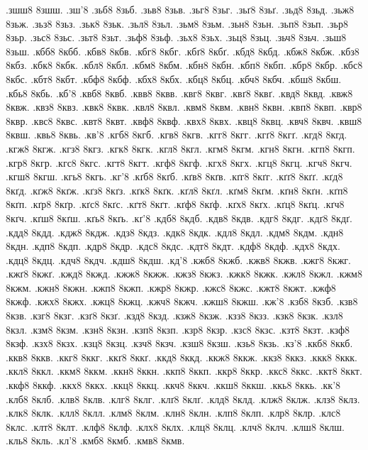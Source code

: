 {.зшш8 8зшш.
.зш'8
.зьб8 8зьб.
.зьв8 8зьв.
.зьг8 8зьг.
.зьґ8 8зьґ.
.зьд8 8зьд.
.зьж8 8зьж.
.зьз8 8зьз.
.зьк8 8зьк.
.зьл8 8зьл.
.зьм8 8зьм.
.зьн8 8зьн.
.зьп8 8зьп.
.зьр8 8зьр.
.зьс8 8зьс.
.зьт8 8зьт.
.зьф8 8зьф.
.зьх8 8зьх.
.зьц8 8зьц.
.зьч8 8зьч.
.зьш8 8зьш.
.кбб8 8кбб.
.кбв8 8кбв.
.кбг8 8кбг.
.кбґ8 8кбґ.
.кбд8 8кбд.
.кбж8 8кбж.
.кбз8 8кбз.
.кбк8 8кбк.
.кбл8 8кбл.
.кбм8 8кбм.
.кбн8 8кбн.
.кбп8 8кбп.
.кбр8 8кбр.
.кбс8 8кбс.
.кбт8 8кбт.
.кбф8 8кбф.
.кбх8 8кбх.
.кбц8 8кбц.
.кбч8 8кбч.
.кбш8 8кбш.
.кбь8 8кбь.
.кб'8
.квб8 8квб.
.квв8 8квв.
.квг8 8квг.
.квґ8 8квґ.
.квд8 8квд.
.квж8 8квж.
.квз8 8квз.
.квк8 8квк.
.квл8 8квл.
.квм8 8квм.
.квн8 8квн.
.квп8 8квп.
.квр8 8квр.
.квс8 8квс.
.квт8 8квт.
.квф8 8квф.
.квх8 8квх.
.квц8 8квц.
.квч8 8квч.
.квш8 8квш.
.квь8 8квь.
.кв'8
.кгб8 8кгб.
.кгв8 8кгв.
.кгг8 8кгг.
.кгґ8 8кгґ.
.кгд8 8кгд.
.кгж8 8кгж.
.кгз8 8кгз.
.кгк8 8кгк.
.кгл8 8кгл.
.кгм8 8кгм.
.кгн8 8кгн.
.кгп8 8кгп.
.кгр8 8кгр.
.кгс8 8кгс.
.кгт8 8кгт.
.кгф8 8кгф.
.кгх8 8кгх.
.кгц8 8кгц.
.кгч8 8кгч.
.кгш8 8кгш.
.кгь8 8кгь.
.кг'8
.кґб8 8кґб.
.кґв8 8кґв.
.кґг8 8кґг.
.кґґ8 8кґґ.
.кґд8 8кґд.
.кґж8 8кґж.
.кґз8 8кґз.
.кґк8 8кґк.
.кґл8 8кґл.
.кґм8 8кґм.
.кґн8 8кґн.
.кґп8 8кґп.
.кґр8 8кґр.
.кґс8 8кґс.
.кґт8 8кґт.
.кґф8 8кґф.
.кґх8 8кґх.
.кґц8 8кґц.
.кґч8 8кґч.
.кґш8 8кґш.
.кґь8 8кґь.
.кґ'8
.кдб8 8кдб.
.кдв8 8кдв.
.кдг8 8кдг.
.кдґ8 8кдґ.
.кдд8 8кдд.
.кдж8 8кдж.
.кдз8 8кдз.
.кдк8 8кдк.
.кдл8 8кдл.
.кдм8 8кдм.
.кдн8 8кдн.
.кдп8 8кдп.
.кдр8 8кдр.
.кдс8 8кдс.
.кдт8 8кдт.
.кдф8 8кдф.
.кдх8 8кдх.
.кдц8 8кдц.
.кдч8 8кдч.
.кдш8 8кдш.
.кд'8
.кжб8 8кжб.
.кжв8 8кжв.
.кжг8 8кжг.
.кжґ8 8кжґ.
.кжд8 8кжд.
.кжж8 8кжж.
.кжз8 8кжз.
.кжк8 8кжк.
.кжл8 8кжл.
.кжм8 8кжм.
.кжн8 8кжн.
.кжп8 8кжп.
.кжр8 8кжр.
.кжс8 8кжс.
.кжт8 8кжт.
.кжф8 8кжф.
.кжх8 8кжх.
.кжц8 8кжц.
.кжч8 8кжч.
.кжш8 8кжш.
.кж'8
.кзб8 8кзб.
.кзв8 8кзв.
.кзг8 8кзг.
.кзґ8 8кзґ.
.кзд8 8кзд.
.кзж8 8кзж.
.кзз8 8кзз.
.кзк8 8кзк.
.кзл8 8кзл.
.кзм8 8кзм.
.кзн8 8кзн.
.кзп8 8кзп.
.кзр8 8кзр.
.кзс8 8кзс.
.кзт8 8кзт.
.кзф8 8кзф.
.кзх8 8кзх.
.кзц8 8кзц.
.кзч8 8кзч.
.кзш8 8кзш.
.кзь8 8кзь.
.кз'8
.ккб8 8ккб.
.ккв8 8ккв.
.ккг8 8ккг.
.ккґ8 8ккґ.
.ккд8 8ккд.
.ккж8 8ккж.
.ккз8 8ккз.
.ккк8 8ккк.
.ккл8 8ккл.
.ккм8 8ккм.
.ккн8 8ккн.
.ккп8 8ккп.
.ккр8 8ккр.
.ккс8 8ккс.
.ккт8 8ккт.
.ккф8 8ккф.
.ккх8 8ккх.
.ккц8 8ккц.
.ккч8 8ккч.
.ккш8 8ккш.
.ккь8 8ккь.
.кк'8
.клб8 8клб.
.клв8 8клв.
.клг8 8клг.
.клґ8 8клґ.
.клд8 8клд.
.клж8 8клж.
.клз8 8клз.
.клк8 8клк.
.клл8 8клл.
.клм8 8клм.
.клн8 8клн.
.клп8 8клп.
.клр8 8клр.
.клс8 8клс.
.клт8 8клт.
.клф8 8клф.
.клх8 8клх.
.клц8 8клц.
.клч8 8клч.
.клш8 8клш.
.кль8 8кль.
.кл'8
.кмб8 8кмб.
.кмв8 8кмв.
}
